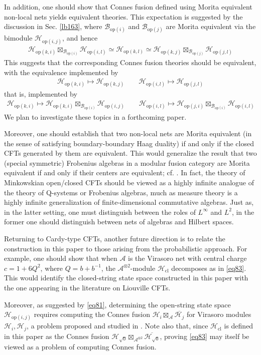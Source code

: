 \documentclass[11pt,b5paper,notitlepage]{article}
\theoremstyle{definition}
\theoremstyle{plain}
\newcommand{\ovl}{\overline}
\newcommand{\MA}{\mathcal A}
\newcommand{\MH}{\mathcal H}
\newcommand{\Maa}{{\mathcal A^{\otimes 2}}}
\newcommand{\sqz}{{\sqrt 0}}
\newcommand{\Hcl}{\mathcal H_{\mathrm{cl}}}
\newcommand{\Bopi}{\mathcal B_{\mathrm{op}(i)}}
\newcommand{\Bopj}{\mathcal B_{\mathrm{op}(j)}}
\newcommand{\Hop}[1]{\mathcal H_{\mathrm{op}({#1})}}
\newcommand{\Hopij}{\mathcal H_{\mathrm{op}(i,j)}}
\newcommand{\Hopji}{\mathcal H_{\mathrm{op}(j,i)}}
\numberwithin{equation}{section}
\begin{document}
In addition, one should show that Connes fusion defined using Morita equivalent non-local nets yields equivalent theories. This expectation is suggested by the discussion in Sec. \ref{lb163}, where $\Bopi$ and $\Bopj$ are Morita equivalent via the bimodule $\Hopij$, and hence
\begin{align*}
\Hop{k,i}\boxtimes_{\Bopi}\Hop{i,l}\simeq \Hop{k,l}\simeq \Hop{k,j}\boxtimes_{\Bopj}\Hop{j,l}
\end{align*}
This suggests that the corresponding Connes fusion theories should be equivalent, with the equivalence implemented by
\begin{gather*}
\Hop{k,i}\mapsto\Hop{k,j}\qquad \Hop{i,l}\mapsto\Hop{j,l}
\end{gather*}
that is, implemented by
\begin{gather*}
\Hop{k,i}\mapsto\Hop{k,i}\boxtimes_{\Bopi}\Hopij\qquad \Hop{i,l}\mapsto \Hopji\boxtimes_{\Bopi}\Hop{i,l}
\end{gather*}
We plan to investigate these topics in a forthcoming paper.

Moreover, one should establish that two non-local nets are Morita equivalent (in the sense of satisfying boundary-boundary Haag duality) if and only if the closed CFTs generated by them are equivalent. This would generalize the result that two (special symmetric) Frobenius algebras in a modular fusion category are Morita equivalent if and only if their centers are equivalent; cf. \cite{KR08}. In fact, the theory of Minkowskian open/closed CFTs should be viewed as a highly infinite analogue of the theory of Q-systems or Frobenius algebras, much as measure theory is a highly infinite generalization of finite-dimensional commutative algebras. Just as, in the latter setting, one must distinguish between the roles of $L^\infty$ and $L^2$, in the former one should distinguish between nets of algebras and Hilbert spaces.



Returning to Cardy-type CFTs, another future direction is to relate the construction in this paper to those arising from the probabilistic approach. For example, one should show that when $\MA$ is the Virasoro net with central charge $c=1+6Q^2$, where $Q=b+b^{-1}$, the $\Maa$-module $\Hcl$ decomposes as in \eqref{eq83}. This would identify the closed-string state space constructed in this paper with the one appearing in the literature on Liouville CFTs.

Moreover, as suggested by \eqref{eq81}, determining the open-string state space $\Hopij$ requires computing the Connes fusion $\MH_i\boxtimes_\MA\ovl{\MH_j}$ for Virasoro modules $\MH_i,\MH_j$, a problem proposed and studied in \cite{Tes01,Tes09}. Note also that, since $\Hcl$ is defined in this paper as the Connes fusion $\MH_\sqz\boxtimes_{\Maa}\ovl{\MH_\sqz}$, proving \eqref{eq83} may itself be viewed as a problem of computing Connes fusion.
\end{document}
